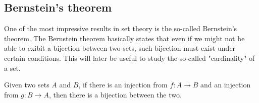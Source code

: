 \subsection{Bernstein's theorem}
One of the most impressive results in set theory is the so-called Bernstein's theorem. The Bernstein 
theorem basically states that even if we might not be able to exibit a bijection between two sets, such 
bijection must exist under certain conditions. This will later be useful to study the so-called "cardinality" of 
a set. \\

\begin{theorem}
\label{thm:Bernstein}
    Given two sets $A$ and $B$, if there is an injection from $f : A \rightarrow B$ and an 
    injection from $g : B \rightarrow A$, then there is a bijection between the two.
\end{theorem}
